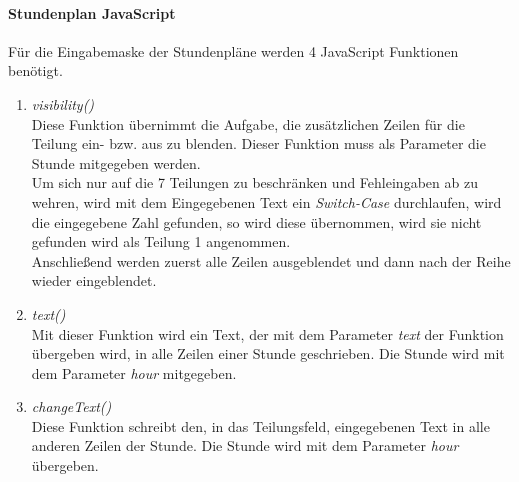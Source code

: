 \paragraph{Stundenplan JavaScript\\} \label{sec:content_imple_input_java_lessons}
Für die Eingabemaske der Stundenpläne werden 4 JavaScript Funktionen benötigt.
\begin{enumerate}
	\item \textit{visibility()}\\
	Diese Funktion übernimmt die Aufgabe, die zusätzlichen Zeilen für die Teilung ein- bzw. aus zu blenden. Dieser Funktion muss als Parameter die Stunde mitgegeben werden.\\
	Um sich nur auf die 7 Teilungen zu beschränken und Fehleingaben ab zu wehren, wird mit dem Eingegebenen Text ein \textit{Switch-Case} durchlaufen, wird die eingegebene Zahl gefunden, so wird diese übernommen, wird sie nicht gefunden wird als Teilung 1 angenommen.\\
	Anschließend werden zuerst alle Zeilen ausgeblendet und dann nach der Reihe wieder eingeblendet.
	
	
	
	\item \textit{text()}\\
	Mit dieser Funktion wird ein Text, der mit dem Parameter \textit{text} der Funktion übergeben wird, in alle Zeilen einer Stunde geschrieben. Die Stunde wird mit dem Parameter \textit{hour} mitgegeben.
	
	
	
	\item \textit{changeText()}\\
	Diese Funktion schreibt den, in das Teilungsfeld, eingegebenen Text in alle anderen Zeilen der Stunde. Die Stunde wird mit dem Parameter \textit{hour} übergeben.
	
	
	

\end{enumerate}
